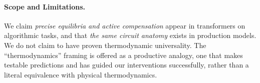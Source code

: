 \paragraph{Scope and Limitations.}
We claim \emph{precise equilibria and active compensation} appear in transformers on algorithmic tasks, and that \emph{the same circuit anatomy} exists in production models. We do not claim to have proven thermodynamic universality. The ``thermodynamics'' framing is offered as a productive analogy, one that makes testable predictions and has guided our interventions successfully, rather than a literal equivalence with physical thermodynamics.
